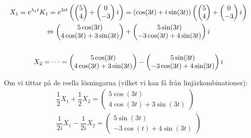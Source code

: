 \begin{equation*}
  \begin{gathered}
    X_1 = e^{\lambda_1t}K_1 = e^{3it}\left(\begin{pmatrix}5\\4\end{pmatrix}+\begin{pmatrix}0\\-3\end{pmatrix}i\right) = (\cos(3t)+i\sin(3t))\left(\begin{pmatrix}5\\4\end{pmatrix}+\begin{pmatrix}0\\-3\end{pmatrix}i\right)\\
    \Leftrightarrow\begin{pmatrix}5\cos(3t)\\4\cos(3t)+3\sin(3t)\end{pmatrix}+\begin{pmatrix}5\sin(3t)\\-3\cos(3t)+4\sin(3t)\end{pmatrix}i\\\\
    X_2 = \cdots = \begin{pmatrix}5\cos(3t)\\4\cos(3t)+3\sin(3t)\end{pmatrix}-\begin{pmatrix}5\sin(3t)\\-3\cos(3t)+4\sin(3t)\end{pmatrix}i
  \end{gathered}
\end{equation*}\par
\noindent Om vi tittar på de reella lösningarna (vilket vi kan få från linjärkombinationer):
\begin{equation*}
  \begin{gathered}
    \dfrac{1}{2}X_1+\dfrac{1}{2}X_2 = \begin{pmatrix}5\cos(3t)\\4\cos(3t)+3\sin(3t)\end{pmatrix}\\
    \dfrac{1}{2i}X_1-\dfrac{1}{2i}X_2 = \begin{pmatrix}5\sin(3t)\\-3\cos(t)+4\sin(3t)\end{pmatrix}
  \end{gathered}
\end{equation*}\par
